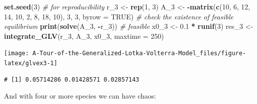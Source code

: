 \documentclass[]{book}
\newenvironment{Shaded}{\begin{snugshade}}{\end{snugshade}}
\newcommand{\CommentTok}[1]{\textcolor[rgb]{0.56,0.35,0.01}{\textit{#1}}}
\newcommand{\DataTypeTok}[1]{\textcolor[rgb]{0.13,0.29,0.53}{#1}}
\newcommand{\DecValTok}[1]{\textcolor[rgb]{0.00,0.00,0.81}{#1}}
\newcommand{\FloatTok}[1]{\textcolor[rgb]{0.00,0.00,0.81}{#1}}
\newcommand{\KeywordTok}[1]{\textcolor[rgb]{0.13,0.29,0.53}{\textbf{#1}}}
\newcommand{\NormalTok}[1]{#1}
\newcommand{\OperatorTok}[1]{\textcolor[rgb]{0.81,0.36,0.00}{\textbf{#1}}}
\newcommand{\OtherTok}[1]{\textcolor[rgb]{0.56,0.35,0.01}{#1}}
\newcommand{\StringTok}[1]{\textcolor[rgb]{0.31,0.60,0.02}{#1}}
\begin{document}
\begin{Shaded}
\begin{Highlighting}[]
\KeywordTok{set.seed}\NormalTok{(}\DecValTok{3}\NormalTok{) }\CommentTok{# for reproducibility}
\NormalTok{r_}\DecValTok{3}\NormalTok{ <-}\StringTok{ }\KeywordTok{rep}\NormalTok{(}\DecValTok{1}\NormalTok{, }\DecValTok{3}\NormalTok{)}
\NormalTok{A_}\DecValTok{3}\NormalTok{ <-}\StringTok{ }\OperatorTok{-}\KeywordTok{matrix}\NormalTok{(}\KeywordTok{c}\NormalTok{(}\DecValTok{10}\NormalTok{, }\DecValTok{6}\NormalTok{, }\DecValTok{12}\NormalTok{, }
                 \DecValTok{14}\NormalTok{, }\DecValTok{10}\NormalTok{, }\DecValTok{2}\NormalTok{, }
                 \DecValTok{8}\NormalTok{, }\DecValTok{18}\NormalTok{, }\DecValTok{10}\NormalTok{), }\DecValTok{3}\NormalTok{, }\DecValTok{3}\NormalTok{, }\DataTypeTok{byrow =} \OtherTok{TRUE}\NormalTok{)}
\CommentTok{# check the existence of feasible equilibrium}
\KeywordTok{print}\NormalTok{(}\KeywordTok{solve}\NormalTok{(A_}\DecValTok{3}\NormalTok{, }\OperatorTok{-}\NormalTok{r_}\DecValTok{3}\NormalTok{)) }\CommentTok{# feasible}
\NormalTok{x0_}\DecValTok{3}\NormalTok{ <-}\StringTok{ }\FloatTok{0.1} \OperatorTok{*}\StringTok{ }\KeywordTok{runif}\NormalTok{(}\DecValTok{3}\NormalTok{)}
\NormalTok{res_}\DecValTok{3}\NormalTok{ <-}\StringTok{ }\KeywordTok{integrate_GLV}\NormalTok{(r_}\DecValTok{3}\NormalTok{, A_}\DecValTok{3}\NormalTok{, x0_}\DecValTok{3}\NormalTok{, }\DataTypeTok{maxtime =} \DecValTok{250}\NormalTok{)}
\end{Highlighting}
\end{Shaded}

\begin{center}\texttt{[image: A-Tour-of-the-Generalized-Lotka-Volterra-Model\_files/figure-latex/glvex3-1]} \end{center}

\begin{verbatim}
# [1] 0.05714286 0.01428571 0.02857143
\end{verbatim}

And with four or more species we can have chaos:
\end{document}
